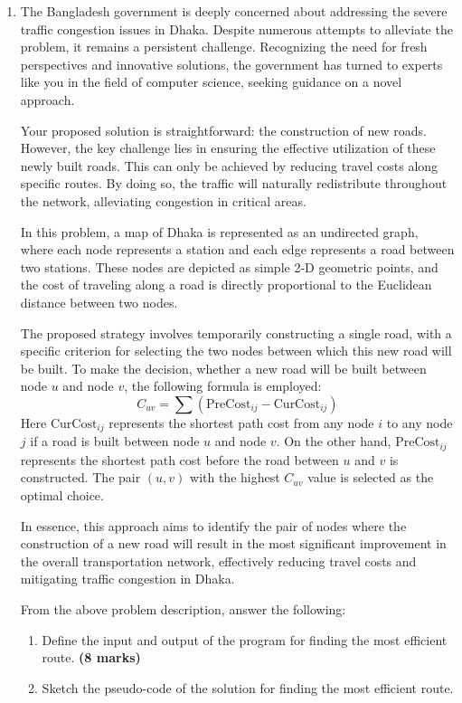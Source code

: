 \documentclass[12pt]{article}
\newcommand{\mk}[1]{\textcolor{orange!70!black}{\small\textbf{(#1 marks)}}}
\begin{document}
\begin{enumerate}

  \item The Bangladesh government is deeply concerned about addressing the severe traffic congestion issues in Dhaka. Despite numerous attempts to alleviate the problem, it remains a persistent challenge. Recognizing the need for fresh perspectives and innovative solutions, the government has turned to experts like you in the field of computer science, seeking guidance on a novel approach.

    Your proposed solution is straightforward: the construction of new roads. However, the key challenge lies in ensuring the effective utilization of these newly built roads. This can only be achieved by reducing travel costs along specific routes. By doing so, the traffic will naturally redistribute throughout the network, alleviating congestion in critical areas.

    In this problem, a map of Dhaka is represented as an undirected graph, where each node represents a station and each edge represents a road between two stations. These nodes are depicted as simple 2-D geometric points, and the cost of traveling along a road is directly proportional to the Euclidean distance between two nodes.

    The proposed strategy involves temporarily constructing a single road, with a specific criterion for selecting the two nodes between which this new road will be built. To make the decision, whether a new road will be built between node $u$ and node $v$, the following formula is employed:
    \[
      C_{uv} = \sum \left( \text{PreCost}_{ij} - \text{CurCost}_{ij} \right)
    \]
    Here $\text{CurCost}_{ij}$ represents the shortest path cost from any node $i$ to any node $j$ if a road is built between node $u$ and node $v$. On the other hand, $\text{PreCost}_{ij}$ represents the shortest path cost before the road between $u$ and $v$ is constructed. The pair $(u,v)$ with the highest $C_{uv}$ value is selected as the optimal choice.

    In essence, this approach aims to identify the pair of nodes where the construction of a new road will result in the most significant improvement in the overall transportation network, effectively reducing travel costs and mitigating traffic congestion in Dhaka.

    From the above problem description, answer the following:


    \begin{enumerate}
      \item  Define the input and output of the program for finding the most efficient route.
        \mk{8}
      \item Sketch the pseudo-code of the solution for finding the most efficient route.


\end{enumerate}
\end{enumerate}
\end{document}
